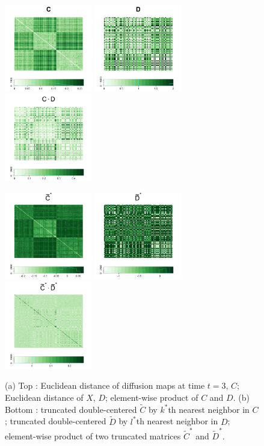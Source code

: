 \documentclass[12pt]{article}
\begin{document}
\begin{figure}[H]
	\centering
	\includegraphics[width=1.5in]{../Figure/C.png}
	\includegraphics[width=1.5in]{../Figure/D.png}
	\includegraphics[width=1.5in]{../Figure/CD.png}
	
	\includegraphics[width=1.5in]{../Figure/tildeCtrunc.png}
	\includegraphics[width=1.5in]{../Figure/tildeDtrunc.png}
	\includegraphics[width=1.5in]{../Figure/tildeCDtrunc.png}
	\caption{(a) Top : Euclidean distance of diffusion maps at time $t=3$, $C$; Euclidean distance of $X$, $D$; element-wise product of $C$ and $D$. (b) Bottom : truncated double-centered  $\tilde{C}$ by $k^{*}$th nearest neighbor in $C$; truncated double-centered $\tilde{D}$ by $l^{*}$th nearest neighbor in $D$; element-wise product of two truncated matrices $\tilde{C}^{*}$ and $\tilde{D}^{*}$. }
	\label{fig:MGCmatrices}
\end{figure}	
\end{document}
